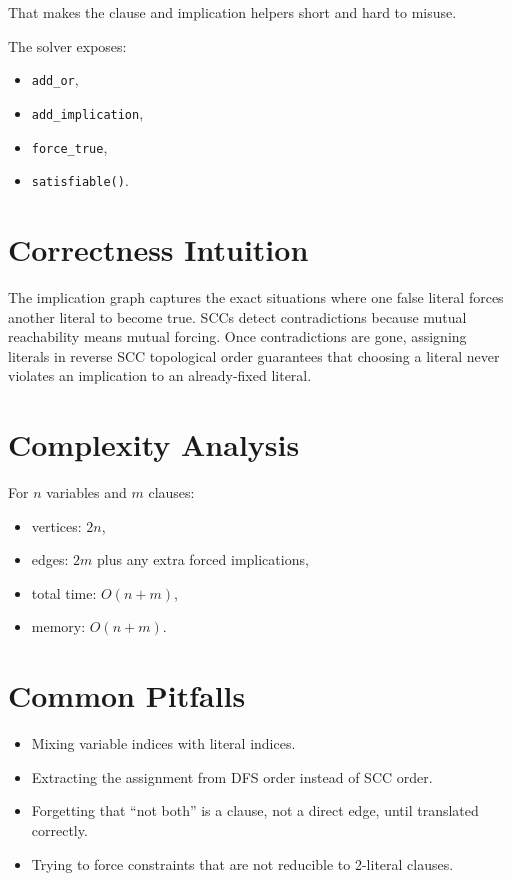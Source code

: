 That makes the clause and implication helpers short and hard to misuse.

The solver exposes:

\begin{itemize}
  \item \texttt{add\_or},
  \item \texttt{add\_implication},
  \item \texttt{force\_true},
  \item \texttt{satisfiable()}.
\end{itemize}

\section*{Correctness Intuition}

The implication graph captures the exact situations where one false literal forces another literal to become true. SCCs
detect contradictions because mutual reachability means mutual forcing. Once contradictions are gone, assigning literals
in reverse SCC topological order guarantees that choosing a literal never violates an implication to an already-fixed
literal.

\section*{Complexity Analysis}

For \(n\) variables and \(m\) clauses:

\begin{itemize}
  \item vertices: \(2n\),
  \item edges: \(2m\) plus any extra forced implications,
  \item total time: \(O(n+m)\),
  \item memory: \(O(n+m)\).
\end{itemize}

\section*{Common Pitfalls}

\begin{itemize}
  \item Mixing variable indices with literal indices.
  \item Extracting the assignment from DFS order instead of SCC order.
  \item Forgetting that ``not both'' is a clause, not a direct edge, until translated correctly.
  \item Trying to force constraints that are not reducible to 2-literal clauses.
\end{itemize}

